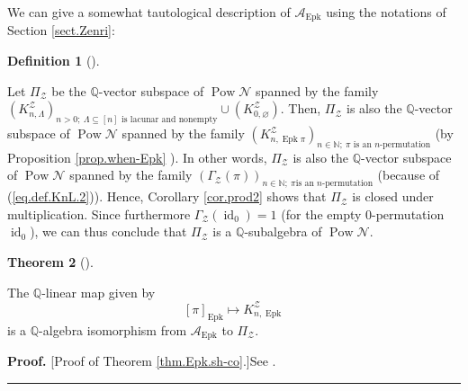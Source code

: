 \documentclass[numbers=enddot,12pt,final,onecolumn,notitlepage]{scrartcl}%
\theoremstyle{definition}
\newtheorem{theo}{Theorem}[section]
\newenvironment{theorem}[1][]
{\begin{theo}[#1]\begin{leftbar}}
{\end{leftbar}\end{theo}}
\newtheorem{defi}[theo]{Definition}
\newenvironment{definition}[1][]
{\begin{defi}[#1]\begin{leftbar}}
{\end{leftbar}\end{defi}}
\newenvironment{proof}[1][Proof]{\noindent\textbf{#1.} }{\ \rule{0.5em}{0.5em}}
\newenvironment{vershort}{}{}
\begin{document}
We can give a somewhat tautological description of $\mathcal{A}%
_{\operatorname*{Epk}}$ using the notations of Section \ref{sect.Zenri}:

\begin{definition}
Let $\Pi_{\mathcal{Z}}$ be the $\mathbb{Q}$-vector subspace of
$\operatorname*{Pow}\mathcal{N}$ spanned by the family $\left(  K_{n,\Lambda
}^{\mathcal{Z}}\right)  _{n>0;\ \Lambda\subseteq\left[  n\right]  \text{ is
lacunar and nonempty}}\cup\left(  K_{0,\varnothing}^{\mathcal{Z}}\right)  $.
Then, $\Pi_{\mathcal{Z}}$ is also the $\mathbb{Q}$-vector subspace of
$\operatorname*{Pow}\mathcal{N}$ spanned by the family $\left(
K_{n,\operatorname*{Epk}\pi}^{\mathcal{Z}}\right)  _{n\in\mathbb{N}%
;\ \pi\text{ is an }n\text{-permutation}}$ (by Proposition \ref{prop.when-Epk}%
). In other words, $\Pi_{\mathcal{Z}}$ is also the $\mathbb{Q}$-vector
subspace of $\operatorname*{Pow}\mathcal{N}$ spanned by the family $\left(
\Gamma_{\mathcal{Z}}\left(  \pi\right)  \right)  _{n\in\mathbb{N};\ \pi\text{
is an }n\text{-permutation}}$ (because of (\ref{eq.def.KnL.2})). Hence,
Corollary \ref{cor.prod2} shows that $\Pi_{\mathcal{Z}}$ is closed under
multiplication. Since furthermore $\Gamma_{\mathcal{Z}}\left(
\operatorname*{id}\nolimits_{0}\right)  =1$ (for the empty $0$-permutation
$\operatorname*{id}\nolimits_{0}$), we can thus conclude that $\Pi
_{\mathcal{Z}}$ is a $\mathbb{Q}$-subalgebra of $\operatorname*{Pow}%
\mathcal{N}$.
\end{definition}

\begin{theorem}
\label{thm.Epk.sh-co}The $\mathbb{Q}$-linear map given by%
\[
\left[  \pi\right]  _{\operatorname*{Epk}}\mapsto K_{n,\operatorname*{Epk}%
}^{\mathcal{Z}}%
\]
is a $\mathbb{Q}$-algebra isomorphism from $\mathcal{A}_{\operatorname*{Epk}}$
to $\Pi_{\mathcal{Z}}$.
\end{theorem}

\begin{vershort}
\begin{proof}
[Proof of Theorem \ref{thm.Epk.sh-co}.]See \cite{verlong}.
\end{proof}
\end{vershort}
\end{document}
